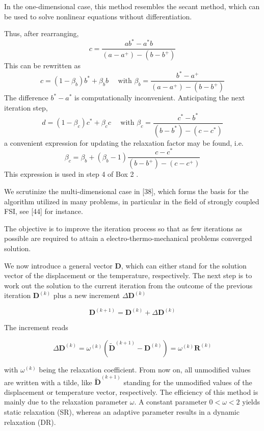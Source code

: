 In the one-dimensional case, this method resembles the secant method, which can be used to solve nonlinear equations without differentiation.



Thus, after rearranging,
\[
c=\frac{a b^{*}-a^{*} b}{\left(a-a^{+}\right)-\left(b-b^{+}\right)}
\]
This can be rewritten as
\[
c=\left(1-\beta_{b}\right) b^{*}+\beta_{b} b \quad \text { with } \beta_{b}=\frac{b^{*}-a^{+}}{\left(a-a^{+}\right)-\left(b-b^{+}\right)}
\]
The difference \(b^{*}-a^{*}\) is computationally inconvenient. Anticipating the next iteration step,
\[
d=\left(1-\beta_{c}\right) c^{*}+\beta_{c} c \quad \text { with } \beta_{c}=\frac{c^{*}-b^{*}}{\left(b-b^{*}\right)-\left(c-c^{*}\right)}
\]
a convenient expression for updating the relaxation factor may be found, i.e.
\[
\beta_{c}=\beta_{b}+\left(\beta_{b}-1\right) \frac{c-c^{*}}{\left(b-b^{+}\right)-\left(c-c^{+}\right)}
\]
This expression is used in step 4 of Box 2 .


We scrutinize the multi-dimensional case in [38], which forms the basis for the algorithm utilized in many problems, in particular in the field of strongly coupled FSI, see [44] for instance.

The objective is to improve the iteration process so that as few iterations as possible are required to attain a electro-thermo-mechanical problems converged solution.

We now introduce a general vector $\mathbf{D}$, which can either stand for the solution vector of the displacement or the temperature, respectively. The next step is to work out the solution to the current iteration from the outcome of the previous iteration $\mathbf{D}^{(k)}$ plus a new increment $\Delta \mathbf{D}^{(k)}$

$$
\mathbf{D}^{(k+1)}=\mathbf{D}^{(k)}+\Delta \mathbf{D}^{(k)}
$$

The increment reads

$$
\Delta \mathbf{D}^{(k)}=\omega^{(k)}\left(\tilde{\mathbf{D}}^{(k+1)}-\mathbf{D}^{(k)}\right)=\omega^{(k)} \mathbf{R}^{(k)}
$$

with $\omega^{(k)}$ being the relaxation coefficient. From now on, all unmodified values are written with a tilde, like $\tilde{\mathbf{D}}^{(k+1)}$ standing for the unmodified values of the displacement or temperature vector, respectively. The efficiency of this method is mainly due to the relaxation parameter $\omega$. A constant parameter $0<\omega<2$ yields static relaxation (SR), whereas an adaptive parameter results in a dynamic relaxation (DR).

